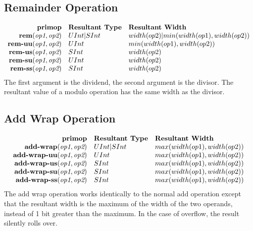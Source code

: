 \documentclass[12pt]{article}
\begin{document}
\subsection{Remainder Operation}
\[
\begin{array}{rll}
\text{\bf primop} & \text{\bf Resultant Type} & \text{\bf Resultant Width} \\
\text{\bf rem}(   \text{\em op1}, \text{\em op2}) & UInt|SInt & width(op2)|min(width(op1),width(op2))  \\
\text{\bf rem-uu}(\text{\em op1}, \text{\em op2}) &   UInt & min(width(op1),width(op2))  \\
\text{\bf rem-us}(\text{\em op1}, \text{\em op2}) &   SInt & width(op2)  \\
\text{\bf rem-su}(\text{\em op1}, \text{\em op2}) &   UInt & width(op2)     \\
\text{\bf rem-ss}(\text{\em op1}, \text{\em op2}) &   SInt & width(op2)  \\
\end{array}
\]
The first argument is the dividend, the second argument is the divisor.
The resultant value of a modulo operation has the same width as the divisor.

\subsection{Add Wrap Operation}
\[
\begin{array}{rll}
\text{\bf primop} & \text{\bf Resultant Type} & \text{\bf Resultant Width} \\
\text{\bf add-wrap}(   \text{\em op1}, \text{\em op2}) & UInt|SInt & max(width(op1),width(op2)) \\
\text{\bf add-wrap-uu}(\text{\em op1}, \text{\em op2}) & UInt & max(width(op1),width(op2)) \\
\text{\bf add-wrap-us}(\text{\em op1}, \text{\em op2}) & SInt & max(width(op1),width(op2)) \\
\text{\bf add-wrap-su}(\text{\em op1}, \text{\em op2}) & SInt & max(width(op1),width(op2)) \\
\text{\bf add-wrap-ss}(\text{\em op1}, \text{\em op2}) & SInt & max(width(op1),width(op2)) \\
\end{array}
\]
The add wrap operation works identically to the normal add operation except that the resultant width is the maximum of the width of the two operands, instead of 1 bit greater than the maximum.
In the case of overflow, the result silently rolls over.
\end{document}
